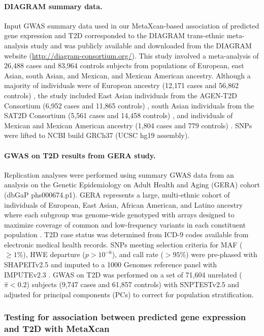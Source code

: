 \documentclass[10pt]{article}
\begin{document}
\paragraph{DIAGRAM summary data.} Input GWAS summary data used in our MetaXcan-based association of predicted gene expression and T2D corresponded to the DIAGRAM trans-ethnic meta-analysis study \cite{Replication2014} and was publicly available and downloaded from the DIAGRAM website (\url{http://diagram-consortium.org/}). This study involved a meta-analysis of 26,488 cases and 83,964 controls subjects from populations of European, east Asian, south Asian, and Mexican, and Mexican American ancestry. Although a majority of individuals were of European ancestry (12,171 cases and 56,862 controls) \cite{Morris2012b}, the study included East Asian individuals from the AGEN-T2D Consortium (6,952 cases and 11,865 controls) \cite{Cho2011}, south Asian individuals from the SAT2D Consortium (5,561 cases and 14,458 controls) \cite{Kooner2011}, and individuals of Mexican and Mexican American ancestry (1,804 cases and 779 controls) \cite{Parra2011}. SNPs were lifted to NCBI build GRCh37 (UCSC hg19 assembly). 

\paragraph{GWAS on T2D results from GERA study.} Replication analyses were performed using summary GWAS data from an analysis on the Genetic Epidemiology on Adult Health and Aging (GERA) cohort (dbGaP phs000674.p1). GERA represents a large, multi-ethnic cohort of individuals of European, East Asian, African American, and Latino ancestry where each subgroup was genome-wide genotyped with arrays designed to maximize coverage of common and low-frequency variants in each constituent population \cite{Hoffmann2011,Hoffmann2011a}. T2D case status was determined from ICD-9 codes available from electronic medical health records. SNPs meeting selection criteria for MAF ( $\geq 1\%$), HWE departure ($p > 10^{-6}$), and call rate ($ > 95\%$) were pre-phased with SHAPEITv2.5 \cite{Delaneau2012} and imputed to a 1000 Genomes reference panel with IMPUTEv2.3 \cite{Howie2009}. GWAS on T2D was performed on a set of 71,604 unrelated ($\hat{\pi}  < 0.2$) subjects (9,747 cases and 61,857 controls) with SNPTESTv2.5 \cite{Marchini2007a} and adjusted for principal components (PCs) to correct for population stratification.   


\subsubsection*{Testing for association between predicted gene expression and T2D with MetaXcan}
\end{document}
